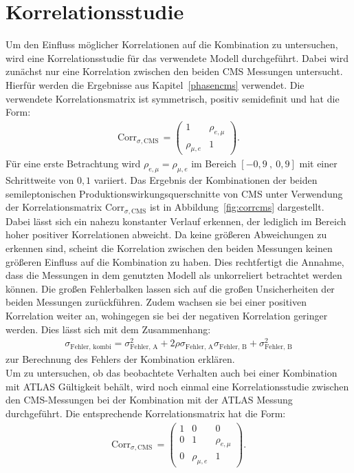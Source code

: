 \section{Korrelationsstudie}
Um den Einfluss möglicher Korrelationen auf die Kombination zu untersuchen, wird eine Korrelationsstudie für das verwendete Modell durchgeführt.
Dabei wird zunächst nur eine Korrelation zwischen den beiden CMS Messungen untersucht.
Hierfür werden die Ergebnisse aus Kapitel~\ref{phasencms} verwendet.
Die verwendete Korrelationsmatrix ist symmetrisch, positiv semidefinit und hat die Form:
\begin{align}
  \text{Corr}_{\sigma,\text{CMS}}\,=\begin{pmatrix}
  1 & \rho_{e, \mu}\\
  \rho_{\mu, e} & 1
  \end{pmatrix}.
  \label{eqn:matrix1}
\end{align}
Für eine erste Betrachtung wird $\rho_{e, \mu}= \rho_{\mu, e}$ im Bereich $[-0,9~,~0,9]$ mit einer Schrittweite von $0,1$ variiert.
Das Ergebnis der Kombinationen der beiden semileptonischen Produktionswirkungsquerschnitte von CMS unter Verwendung der Korrelationsmatrix $\text{Corr}_{\sigma,\text{CMS}}$ ist in Abbildung~\ref{fig:corrcms} dargestellt.
Dabei lässt sich ein nahezu konstanter Verlauf erkennen, der lediglich im Bereich hoher positiver Korrelationen abweicht.
Da keine größeren Abweichungen zu erkennen sind, scheint die Korrelation zwischen den beiden Messungen keinen größeren Einfluss auf die Kombination zu haben.
Dies rechtfertigt die Annahme, dass die Messungen in dem genutzten Modell als unkorreliert betrachtet werden können. Die großen Fehlerbalken lassen sich auf die großen Unsicherheiten der beiden Messungen zurückführen. Zudem wachsen sie bei einer positiven Korrelation weiter an, wohingegen sie bei der negativen Korrelation geringer werden. Dies lässt sich mit dem Zusammenhang:
\begin{align}
  \sigma_{\text{Fehler, kombi}} = \sigma_{\text{Fehler, A}}^2 + 2\rho\sigma_{\text{Fehler, A}}\sigma_{\text{Fehler, B}} + \sigma_{\text{Fehler, B}}^2
\end{align}
zur Berechnung des Fehlers der Kombination erklären.\\
Um zu untersuchen, ob das beobachtete Verhalten auch bei einer Kombination mit ATLAS Gültigkeit behält, wird noch einmal eine Korrelationsstudie zwischen den CMS-Messungen bei der Kombination mit der ATLAS Messung durchgeführt. Die entsprechende Korrelationsmatrix hat die Form:
\begin{align}
  \text{Corr}_{\sigma,\text{CMS}}\,=\begin{pmatrix}
  1 & 0 & 0\\
  0 & 1 &\rho_{e, \mu}\\
  0 & \rho_{\mu, e} & 1
  \end{pmatrix}.
  \label{eqn:matrix2}
\end{align}
